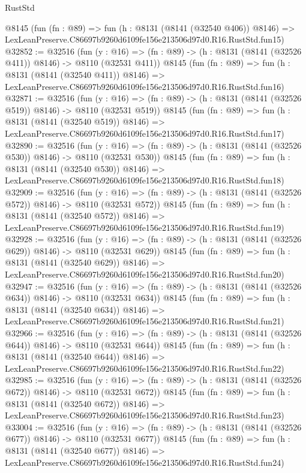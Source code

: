 \begin{lexlean}{RustStd}
\begin{coremodule}
    @8145
    (fun (fn : @89) =>
    fun (h : @8131 (@8141 (@32540 @406)) @8146) =>
    LexLeanPreserve.C86697b9260d6109fe156e213506d97d0.R16.RustStd.fun15)
@32852 := @32516
    (fun (y : @16) => (fn : @89) -> (h : @8131 (@8141 (@32526 @411)) @8146) -> @8110 (@32531 @411))
    @8145
    (fun (fn : @89) =>
    fun (h : @8131 (@8141 (@32540 @411)) @8146) =>
    LexLeanPreserve.C86697b9260d6109fe156e213506d97d0.R16.RustStd.fun16)
@32871 := @32516
    (fun (y : @16) => (fn : @89) -> (h : @8131 (@8141 (@32526 @519)) @8146) -> @8110 (@32531 @519))
    @8145
    (fun (fn : @89) =>
    fun (h : @8131 (@8141 (@32540 @519)) @8146) =>
    LexLeanPreserve.C86697b9260d6109fe156e213506d97d0.R16.RustStd.fun17)
@32890 := @32516
    (fun (y : @16) => (fn : @89) -> (h : @8131 (@8141 (@32526 @530)) @8146) -> @8110 (@32531 @530))
    @8145
    (fun (fn : @89) =>
    fun (h : @8131 (@8141 (@32540 @530)) @8146) =>
    LexLeanPreserve.C86697b9260d6109fe156e213506d97d0.R16.RustStd.fun18)
@32909 := @32516
    (fun (y : @16) => (fn : @89) -> (h : @8131 (@8141 (@32526 @572)) @8146) -> @8110 (@32531 @572))
    @8145
    (fun (fn : @89) =>
    fun (h : @8131 (@8141 (@32540 @572)) @8146) =>
    LexLeanPreserve.C86697b9260d6109fe156e213506d97d0.R16.RustStd.fun19)
@32928 := @32516
    (fun (y : @16) => (fn : @89) -> (h : @8131 (@8141 (@32526 @629)) @8146) -> @8110 (@32531 @629))
    @8145
    (fun (fn : @89) =>
    fun (h : @8131 (@8141 (@32540 @629)) @8146) =>
    LexLeanPreserve.C86697b9260d6109fe156e213506d97d0.R16.RustStd.fun20)
@32947 := @32516
    (fun (y : @16) => (fn : @89) -> (h : @8131 (@8141 (@32526 @634)) @8146) -> @8110 (@32531 @634))
    @8145
    (fun (fn : @89) =>
    fun (h : @8131 (@8141 (@32540 @634)) @8146) =>
    LexLeanPreserve.C86697b9260d6109fe156e213506d97d0.R16.RustStd.fun21)
@32966 := @32516
    (fun (y : @16) => (fn : @89) -> (h : @8131 (@8141 (@32526 @644)) @8146) -> @8110 (@32531 @644))
    @8145
    (fun (fn : @89) =>
    fun (h : @8131 (@8141 (@32540 @644)) @8146) =>
    LexLeanPreserve.C86697b9260d6109fe156e213506d97d0.R16.RustStd.fun22)
@32985 := @32516
    (fun (y : @16) => (fn : @89) -> (h : @8131 (@8141 (@32526 @672)) @8146) -> @8110 (@32531 @672))
    @8145
    (fun (fn : @89) =>
    fun (h : @8131 (@8141 (@32540 @672)) @8146) =>
    LexLeanPreserve.C86697b9260d6109fe156e213506d97d0.R16.RustStd.fun23)
@33004 := @32516
    (fun (y : @16) => (fn : @89) -> (h : @8131 (@8141 (@32526 @677)) @8146) -> @8110 (@32531 @677))
    @8145
    (fun (fn : @89) =>
    fun (h : @8131 (@8141 (@32540 @677)) @8146) =>
    LexLeanPreserve.C86697b9260d6109fe156e213506d97d0.R16.RustStd.fun24)

\end{coremodule}
\end{lexlean}
